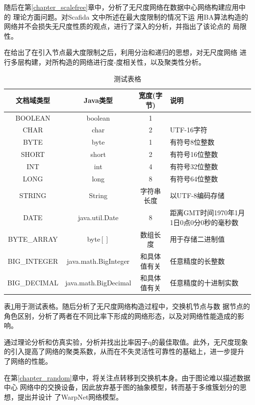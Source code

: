 \documentclass[master]{njuthesis}
\begin{document}
随后在第\ref{chapter_scalefree}章中，分析了无尺度网络在数据中心网络构建应用中的
理论方面问题。对Scafida \cite{gyarmati2010scafida}文中所述在最大度限制的情况下运
用BA算法构造的网络并不会损失无尺度性质的观点，进行了深入的分析，并指出了该论点的
局限性。

在给出了在引入节点最大度限制之后，利用分治和递归的思想，对无尺度网络
进行多层构建，对所构造的网络进行度-度相关性，以及聚类性分析。

\begin{table}
  \centering
  \begin{tabular}{cccp{38mm}}
    \toprule
    \textbf{文档域类型} & \textbf{Java类型} & \textbf{宽度(字节)} & \textbf{说明} \\
    \midrule
    BOOLEAN  & boolean &  1  & \\
    CHAR     & char    &  2  & UTF-16字符 \\
    BYTE     & byte    &  1  & 有符号8位整数 \\
    SHORT    & short   &  2  & 有符号16位整数 \\
    INT      & int     &  4  & 有符号32位整数 \\
    LONG     & long    &  8  & 有符号64位整数 \\
    STRING   & String  &  字符串长度  & 以UTF-8编码存储 \\
    DATE     & java.util.Date & 8 & 距离GMT时间1970年1月1日0点0分0秒的毫秒数 \\
    BYTE\_ARRAY & byte$[]$ & 数组长度 & 用于存储二进制值 \\
    BIG\_INTEGER & java.math.BigInteger & 和具体值有关 & 任意精度的长整数 \\
    BIG\_DECIMAL & java.math.BigDecimal & 和具体值有关 & 任意精度的十进制实数 \\
    \bottomrule
  \end{tabular}
  \caption{测试表格}\label{table:test5}
\end{table}

表\ref{table:test5}用于测试表格。随后分析了无尺度网络构造过程中，交换机节点与数
据节点的角色区别，分析了两者在不同比率下形成的网络形态，以及对网络性能造成的影响。

通过理论分析和仿真实验，分析并找出比率因子q的最佳取值。此外，无尺度现象
的引入提高了网络的聚类系数，从而在不失灵活性可靠性的基础上，进一步提升
了网络的性能。

在第\ref{chapter_random}章中，将关注点转移到交换机本身。由于图论难以描述数据中心
网络中的交换设备，因此放弃基于图的抽象模型，转而基于多维簇划分的思想，提出并设计
了WarpNet网络模型。
\end{document}
